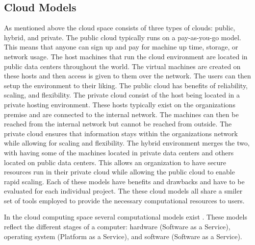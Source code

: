 \documentclass[12pt]{article}
\begin{document}
\subsection{Cloud Models}
As mentioned above the cloud space consists of three types of clouds: public, hybrid, and private. The public cloud typically runs on a pay-as-you-go model. This means that anyone can sign up and pay for machine up time, storage, or network usage. The host machines that run the cloud environment are located in public data centers throughout the world. The virtual machines are created on these hosts and then access is given to them over the network. The users can then setup the environment to their liking. The public cloud has benefits of reliability, scaling, and flexibility. The private cloud consist of the host being located in a private hosting environment.  These hosts typically exist on the organizations premise and are connected to the internal network. The machines can then be reached from the internal network but cannot be reached from outside. The private cloud ensures that information stays within the organizations network while allowing for scaling and flexibility. The hybrid environment merges the two, with having some of the machines located in private data centers and others located on public data centers. This allows an organization to have secure resources run in their private cloud while allowing the public cloud to enable rapid scaling.  Each of these models have benefits and drawbacks and have to be evaluated for each individual project. The these cloud models all share a smiler set of tools employed to provide the necessary computational resources to users.

In the cloud computing space several computational models exist \cite{neto2011demystifying}. These models reflect the different stages of a computer: hardware (Software as a Service), operating system (Platform as a Service), and software (Software as a Service).
\end{document}
